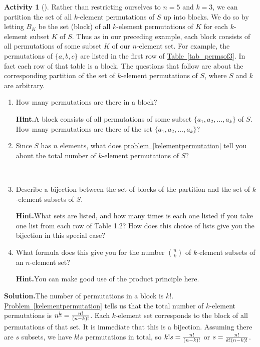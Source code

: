 \documentclass[10pt,]{book}
\theoremstyle{plain}
\theoremstyle{definition}
\newtheorem{activity}[project]{Activity}
\numberwithin{equation}{chapter}
\begin{document}
\begin{activity}[]\label{formulanchoosek}
Rather than restricting ourselves to \(n=5\) and \(k=3\), we can partition the set of all \(k\)-element permutations of \(S\) up into blocks. We do so by letting \(B_K\) be the set (block) of all \(k\)-element permutations of \(K\) for each \(k\)-element subset \(K\) of \(S\). Thus as in our preceding example, each block consists of all permutations of some subset \(K\) of our \(n\)-element set. For example, the permutations of \(\{a,b,c\}\) are listed in the first row of \hyperref[tab_permsof3]{Table~\ref{tab_permsof3}}. In fact each row of that table is a block. The questions that follow are about the corresponding partition of the set of \(k\)-element permutations of \(S\), where \(S\) and \(k\) are arbitrary.%
~\par
\begin{enumerate}[label=(\alph*)]
 \item How many permutations are there in a block?%
\par\medskip\noindent%
\textbf{Hint.}\quad A block consists of all permutations of some subset \(\{a_1 , a_2, \ldots, a_k \}\) of \(S\). How many permutations are there of the set \(\{a_1 , a_2, \ldots, a_k \}\)?
~\par
\item Since \(S\) has \(n\) elements, what does \hyperref[kelementpermutation]{problem~\ref{kelementpermutation}} tell you about the total number of \(k\)-element permutations of \(S\)?%

~\par
\item Describe a bijection between the set of blocks of the partition and the set of \(k\)-element subsets of \(S\).%
\par\medskip\noindent%
\textbf{Hint.}\quad What sets are listed, and how many times is each one listed if you take one list from each row of Table 1.2? How does this choice of lists give you the bijection in this special case?
~\par
\item What formula does this give you for the number \(n\choose k\) of \(k\)-element subsets of an \(n\)-element set?%
\par\medskip\noindent%
\textbf{Hint.}\quad You can make good use of the product principle here.
\end{enumerate}
\par\medskip\noindent%
\textbf{Solution.}\quad The number of permutations in a block is \(k!\). \hyperref[kelementpermutation]{Problem~\ref{kelementpermutation}} tells us that the total number of \(k\)-element permutations is \(n^{\underline{k}}={n!\over (n-k)!}\). Each \(k\)-element set corresponds to the block of all permutations of that set. It is immediate that this is a bijection. Assuming there are \(s\) subsets, we have \(k!s\) permutations in total, so \(k!s={n!\over (n-k)!}\) or \(s= {n!\over k!(n-k)!}\).%
\end{activity}
\end{document}
